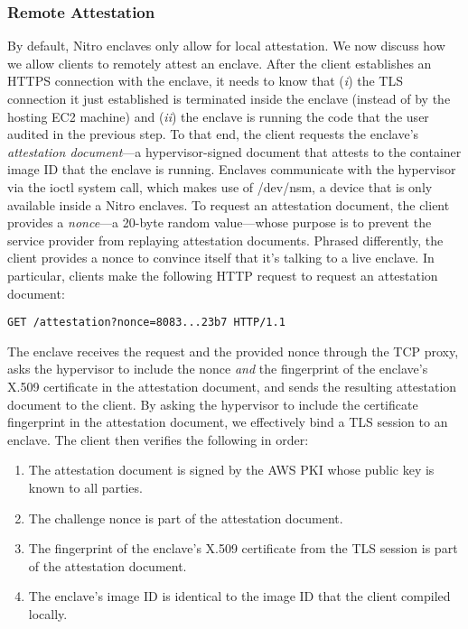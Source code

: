 \subsubsection{Remote Attestation}
\label{sec:attestation}

By default, Nitro enclaves only allow for local attestation.  We now discuss how
we allow clients to remotely attest an enclave.  After the client establishes an
HTTPS connection with the enclave, it needs to know that (\emph{i}) the TLS
connection it just established is terminated inside the enclave (instead of by
the hosting EC2 machine) and (\emph{ii}) the enclave is running the code that
the user audited in the previous step.  To that end, the client requests the
enclave's \emph{attestation document}---a hypervisor-signed document that
attests to the container image ID that the enclave is running.  Enclaves
communicate with the hypervisor via the ioctl system call, which makes use of
/dev/nsm, a device that is only available inside a Nitro enclaves.  To request
an attestation document, the client provides a \emph{nonce}---a 20-byte random
value---whose purpose is to prevent the service provider from replaying
attestation documents.  Phrased differently, the client provides a nonce to
convince itself that it's talking to a live enclave.  In particular, clients
make the following HTTP request to request an attestation document:

\begin{lstlisting}[numbers=none,basicstyle=\small\ttfamily]
GET /attestation?nonce=8083...23b7 HTTP/1.1
\end{lstlisting}

The enclave receives the request and the provided nonce through the TCP proxy,
asks the hypervisor to include the nonce \emph{and} the fingerprint of the
enclave's X.509 certificate in the attestation document, and sends the resulting
attestation document to the client.  By asking the hypervisor to include the
certificate fingerprint in the attestation document, we effectively bind a TLS
session to an enclave.  The client then verifies the following in order:

\begin{enumerate}
    \item The attestation document is signed by the AWS PKI whose public key is
      known to all parties.
    \item The challenge nonce is part of the attestation document.
    \item The fingerprint of the enclave's X.509 certificate from the TLS session is part of the
      attestation document.
    \item The enclave's image ID is identical to the image ID that the client
      compiled locally.
\end{enumerate}

